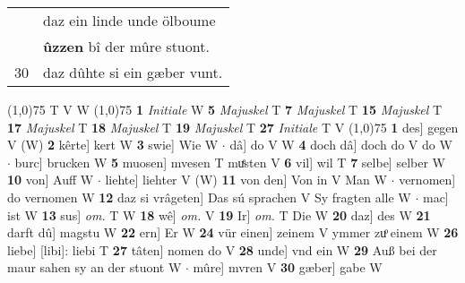\documentclass[8pt,a4paper,notitlepage]{article}
\begin{document}
\begin{table}[ht]
\begin{minipage}[t]{0.5\linewidth}
\begin{tabular}{rl}
 & daz ein linde unde ölboume\\ 
 & \textbf{ûzzen} bî der mûre stuont.\\ 
30 & daz dûhte si ein gæber vunt.\\ 
\end{tabular}
\scriptsize
\line(1,0){75} \newline
T V W \newline
\line(1,0){75} \newline
\textbf{1} \textit{Initiale} W  \textbf{5} \textit{Majuskel} T  \textbf{7} \textit{Majuskel} T  \textbf{15} \textit{Majuskel} T  \textbf{17} \textit{Majuskel} T  \textbf{18} \textit{Majuskel} T  \textbf{19} \textit{Majuskel} T  \textbf{27} \textit{Initiale} T V  \newline
\line(1,0){75} \newline
\textbf{1} des] gegen V (W) \textbf{2} kêrte] kert W \textbf{3} swie] Wie W  $\cdot$ dâ] do V W \textbf{4} doch dâ] doch do V do W  $\cdot$ burc] brucken W \textbf{5} muosen] mvesen T muͤsten V \textbf{6} vil] wil T \textbf{7} selbe] selber W \textbf{10} von] Auff W  $\cdot$ liehte] liehter V (W) \textbf{11} von den] Von in V Man W  $\cdot$ vernomen] do vernomen W \textbf{12} daz si vrâgeten] Das sú sprachen V Sy fragten alle W  $\cdot$ mac] ist W \textbf{13} sus] \textit{om.} T W \textbf{18} wê] \textit{om.} V \textbf{19} Ir] \textit{om.} T Die W \textbf{20} daz] des W \textbf{21} darft dû] magstu W \textbf{22} ern] Er W \textbf{24} vür einen] zeinem V ymmer zuͦ einem W \textbf{26} liebe] [libi]: liebi T \textbf{27} tâten] nomen do V \textbf{28} unde] vnd ein W \textbf{29} Auß bei der maur sahen sy an der stuont W  $\cdot$ mûre] mvren V \textbf{30} gæber] gabe W \newline
\end{minipage}
\end{table}
\end{document}
